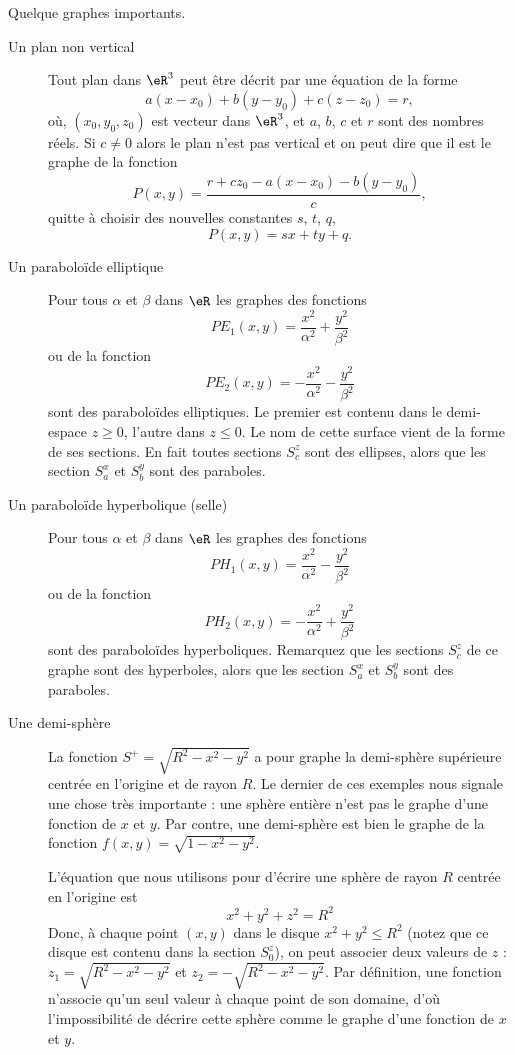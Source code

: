 \begin{example}
	Quelque graphes importants.
  \begin{description}
    \item[Un plan non vertical] Tout plan dans $\eR^3$ peut être décrit par une équation de la forme 
\[
a(x-x_0)+ b(y-y_0) + c(z-z_0) = r,
\] 
où, $(x_0, y_0, z_0)$ est vecteur dans $\eR^3$, et $a$, $b$, $c$ et $r$ sont des nombres réels. Si $c\neq 0$ alors le plan n'est pas vertical et on peut dire que il est le graphe de la fonction 
\[
P(x,y)= \frac{r+cz_0 -a(x-x_0)-b(y-y_0)}{c},
\]
quitte à choisir des nouvelles constantes $s$, $t$, $q$,
\[
P(x,y)=sx +ty +q.
\]
    \item[Un paraboloïde elliptique] Pour tous $\alpha$ et $\beta$ dans $\eR$ les  graphes des fonctions 
\[
PE_1(x,y)=\frac{x^2}{\alpha^2}+\frac{y^2}{\beta^2}
\]
ou de la fonction 
\[
PE_2(x,y)=-\frac{x^2}{\alpha^2}-\frac{y^2}{\beta^2}
\]
sont des paraboloïdes elliptiques. Le premier est contenu dans le demi-espace $z\geq 0$, l'autre dans $z\leq 0$. Le nom de cette surface vient de la forme de ses sections. En fait toutes  sections $S^z_c$ sont des ellipses, alors que les section $S^x_a$ et $S^y_b$ sont des paraboles.   
    \item[Un paraboloïde hyperbolique (selle)]  Pour tous $\alpha$ et $\beta$ dans $\eR$ les  graphes des fonctions 
\[
PH_1(x,y)=\frac{x^2}{\alpha^2}-\frac{y^2}{\beta^2}
\]
ou de la fonction 
\[
PH_2(x,y)=-\frac{x^2}{\alpha^2}+\frac{y^2}{\beta^2}
\]
sont des paraboloïdes hyperboliques. Remarquez que les  sections $S^z_c$ de ce graphe sont des hyperboles, alors que les section $S^x_a$ et $S^y_b$ sont des paraboles.   
    \item[Une demi-sphère] La fonction $S^+=\sqrt{R^2-x^2-y^2}$ a pour graphe la demi-sphère supérieure centrée en l'origine et de rayon $R$.  
Le dernier de ces exemples nous signale une chose très importante : une sphère entière n'est pas le graphe d'une fonction de $x$ et $y$. Par contre, une demi-sphère est bien le graphe de la fonction $f(x,y)=\sqrt{1-x^2-y^2}$.

L'équation que nous utilisons  pour d'écrire une sphère de rayon $R$ centrée en l'origine est 
\[
x^2+y^2+z^2=R^2
\] 
Donc, à  chaque point  $(x,y)$ dans le disque $x^2+y^2\leq R^2$ (notez que ce disque est contenu dans la section $S^z_0$), on peut associer deux valeurs de $z$ : $z_1=\sqrt{R^2-x^2-y^2}$ et  $z_2=-\sqrt{R^2-x^2-y^2}$. Par définition, une fonction n'associe qu'un seul valeur à chaque point de son domaine, d'où l'impossibilité de décrire cette sphère comme le graphe d'une fonction de $x$ et $y$.

  \end{description}
\end{example}

